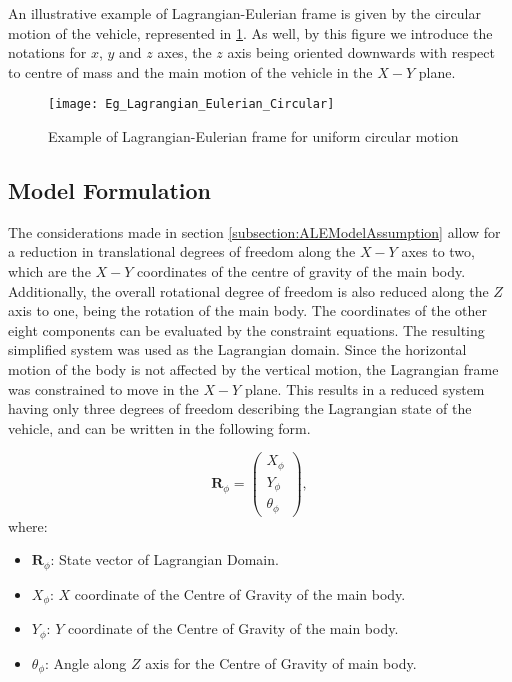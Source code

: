 \noindent An illustrative example of Lagrangian-Eulerian frame is given by the circular motion of the vehicle, represented in \ref{fig:Eg_Lagrangian_Eulerian_Circular}. As well, by this figure we introduce the notations for $x$, $y$ and $z$ axes, the $z$ axis being oriented downwards with respect to centre of mass and the main motion of the vehicle in the $X-Y$ plane. 

\begin{figure}[!ht]
    \centering
    \texttt{[image: Eg\_Lagrangian\_Eulerian\_Circular]}
    \caption{Example of Lagrangian-Eulerian frame for uniform circular motion}
    \label{fig:Eg_Lagrangian_Eulerian_Circular}
\end{figure}

\subsection{Model Formulation}
\label{subsection:ALEModelFormulation}
The considerations made in section \ref{subsection:ALEModelAssumption} allow for a reduction in translational degrees of freedom along the $X-Y$ axes to two, which are the $X-Y$ coordinates of the centre of gravity of the main body. Additionally, the overall rotational degree of freedom is also reduced along the $Z$ axis to one, being the rotation of the main body. The coordinates of the other eight components can be evaluated by the constraint equations. The resulting simplified system was used as the Lagrangian domain. Since the horizontal motion of the body is not affected by the vertical motion, the Lagrangian frame was constrained to move in the $X-Y$ plane. This results in a reduced system having only three degrees of freedom describing the Lagrangian state of the vehicle, and can be written in the following form. \par
\begin{equation}
     \mathbf{R}_{\phi} = \begin{pmatrix} 
                        X_{\phi} \\
                        Y_{\phi} \\
                        \theta_{\phi}
                        \end{pmatrix},
\end{equation}
where:
\begin{itemize}
    \item $\mathbf{R}_{\phi}$: State vector of Lagrangian Domain.
    \item $X_{\phi}$: $X$ coordinate of the Centre of Gravity of the main body.
    \item $Y_{\phi}$: $Y$ coordinate of the Centre of Gravity of the main body.
    \item $\theta_{\phi}$: Angle along $Z$ axis for the Centre of Gravity of main body.
\end{itemize}


